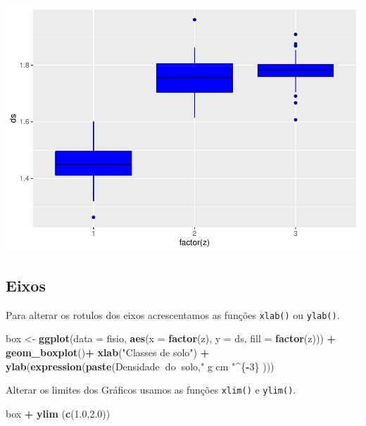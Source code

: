 \documentclass[
]{book}
\newenvironment{Shaded}{\begin{snugshade}}{\end{snugshade}}
\newcommand{\DataTypeTok}[1]{\textcolor[rgb]{0.13,0.29,0.53}{#1}}
\newcommand{\DecValTok}[1]{\textcolor[rgb]{0.00,0.00,0.81}{#1}}
\newcommand{\FloatTok}[1]{\textcolor[rgb]{0.00,0.00,0.81}{#1}}
\newcommand{\KeywordTok}[1]{\textcolor[rgb]{0.13,0.29,0.53}{\textbf{#1}}}
\newcommand{\NormalTok}[1]{#1}
\newcommand{\OperatorTok}[1]{\textcolor[rgb]{0.81,0.36,0.00}{\textbf{#1}}}
\newcommand{\StringTok}[1]{\textcolor[rgb]{0.31,0.60,0.02}{#1}}
\begin{document}
\includegraphics{TudodoR_files/figure-latex/unnamed-chunk-202-1.pdf}

\hypertarget{eixos}{%
\subsection{Eixos}\label{eixos}}

Para alterar os rotulos dos eixos acrescentamos as funções \texttt{xlab()} ou \texttt{ylab()}.

\begin{Shaded}
\begin{Highlighting}[]
\NormalTok{box <-}\StringTok{ }\KeywordTok{ggplot}\NormalTok{(}\DataTypeTok{data =}\NormalTok{ fisio, }\KeywordTok{aes}\NormalTok{(}\DataTypeTok{x =} \KeywordTok{factor}\NormalTok{(z), }\DataTypeTok{y =}\NormalTok{ ds, }\DataTypeTok{fill =} \KeywordTok{factor}\NormalTok{(z))) }\OperatorTok{+}
\StringTok{  }\KeywordTok{geom_boxplot}\NormalTok{()}\OperatorTok{+}
\StringTok{  }\KeywordTok{xlab}\NormalTok{(}\StringTok{"Classes de solo"}\NormalTok{) }\OperatorTok{+}
\StringTok{  }\KeywordTok{ylab}\NormalTok{(}\KeywordTok{expression}\NormalTok{(}\KeywordTok{paste}\NormalTok{(Densidade}\OperatorTok{~}\NormalTok{do}\OperatorTok{~}\NormalTok{solo,}\StringTok{" g cm "}\OperatorTok{^}\NormalTok{\{}\OperatorTok{-}\DecValTok{3}\NormalTok{\} )))}
\end{Highlighting}
\end{Shaded}

Alterar os limites dos Gráficos usamos as funções \texttt{xlim()} e \texttt{ylim()}.

\begin{Shaded}
\begin{Highlighting}[]
\NormalTok{  box }\OperatorTok{+}\StringTok{ }\KeywordTok{ylim}\NormalTok{ (}\KeywordTok{c}\NormalTok{(}\FloatTok{1.0}\NormalTok{,}\FloatTok{2.0}\NormalTok{))}
\end{Highlighting}
\end{Shaded}
\end{document}
